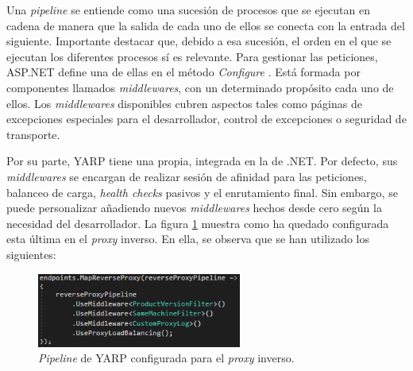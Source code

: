 \documentclass[11pt,spanish,listoffigures]{tfgetsinf}
\begin{document}
Una \emph{pipeline} se entiende como una sucesión de procesos que se ejecutan en cadena de manera que la salida de cada uno de ellos se conecta con la entrada del siguiente. Importante destacar que, debido a esa sucesión, el orden en el que se ejecutan los diferentes procesos sí es relevante. Para gestionar las peticiones, ASP.NET define una de ellas en el método \emph{Configure} \cite{MiddlewaresPipeline}. Está formada por componentes llamados \emph{middlewares}, con un determinado propósito cada uno de ellos. Los \emph{middlewares} disponibles cubren aspectos tales como páginas de excepciones especiales para el desarrollador, control de excepciones o seguridad de transporte.

Por su parte, YARP tiene una propia, integrada en la de .NET. Por defecto, sus \emph{middlewares} se encargan de realizar sesión de afinidad para las peticiones, balanceo de carga, \emph{health checks} pasivos y el enrutamiento final. Sin embargo, se puede personalizar añadiendo nuevos \emph{middlewares} hechos desde cero según la necesidad del desarrollador. La figura \ref{pipelineYARP_imagen} muestra como ha quedado configurada esta última en el \emph{proxy} inverso. En ella, se observa que se han utilizado los siguientes:

\begin{figure}[ht]
\centering
\includegraphics[width=0.6\textwidth]{imagenes/pipelineYARP}
\caption{\emph{Pipeline} de YARP configurada para el \emph{proxy} inverso.}
	\label{pipelineYARP_imagen}
\end{figure}
\end{document}
